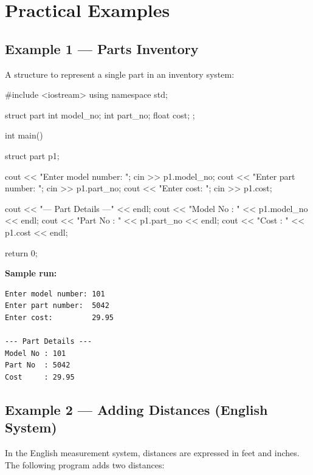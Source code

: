 \section{Practical Examples}
\label{sec:struct-examples}

\subsection{Example 1 --- Parts Inventory}

A structure to represent a single part in an inventory system:

\begin{cppcode}
#include <iostream>
using namespace std;

struct part {
    int   model_no;
    int   part_no;
    float cost;
};

int main() {
    struct part p1;

    cout << "Enter model number: ";
    cin  >> p1.model_no;
    cout << "Enter part number:  ";
    cin  >> p1.part_no;
    cout << "Enter cost:         ";
    cin  >> p1.cost;

    cout << "\n--- Part Details ---" << endl;
    cout << "Model No : " << p1.model_no << endl;
    cout << "Part No  : " << p1.part_no  << endl;
    cout << "Cost     : " << p1.cost     << endl;

    return 0;
}
\end{cppcode}

\noindent
\textbf{Sample run:}
\begin{verbatim}
Enter model number: 101
Enter part number:  5042
Enter cost:         29.95

--- Part Details ---
Model No : 101
Part No  : 5042
Cost     : 29.95
\end{verbatim}

\subsection{Example 2 --- Adding Distances (English System)}

In the English measurement system, distances are expressed in feet and
inches.  The following program adds two distances:

